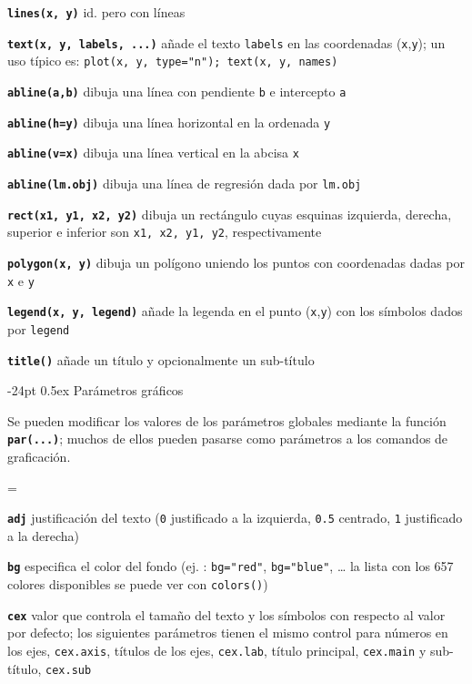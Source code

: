 \documentclass[10pt,landscape]{article}
\makeatletter
\renewcommand\section{\@startsection{section}{1}{0mm}%
                                     {-24pt}%
                                     {0.5ex}%
                                {\color[rgb]{1,0.54902,0}\normalfont\large\bfseries}}
\newcommand{\code}{\texttt}
\newcommand{\bcode}[1]{\texttt{\textbf{#1}}}
\makeatother
\begin{document}
\begin{multicols*}{3}
\bcode{lines(x, y)}  id. pero con líneas

\bcode{text(x, y, \mbox{labels}, ...)}  añade el texto \code{labels} en las coordenadas (\code{x},\code{y}); un uso típico es: \code{plot(x, y, type="n"); text(x, y, names)}

\bcode{abline(a,b)} dibuja una línea con pendiente \code{b} e intercepto \code{a}

\bcode{abline(h=y)}  dibuja una línea horizontal en la ordenada \code{y}

\bcode{abline(v=x)}  dibuja una línea vertical en la abcisa \code{x}

\bcode{abline(lm.obj)}  dibuja una línea de regresión dada por \code{lm.obj}

\bcode{rect(x1, y1, x2, y2)} dibuja un rectángulo cuyas esquinas izquierda, derecha, superior e inferior son \code{x1, x2, y1, y2}, respectivamente

\bcode{polygon(x, y)} dibuja un polígono uniendo los puntos con coordenadas dadas por \code{x} e \code{y}

\bcode{legend(x, y, legend)}  añade la legenda en el punto (\code{x},\code{y}) con los símbolos dados por \code{legend}

\bcode{title()}  añade un título y opcionalmente un sub-título




\section{Parámetros gráficos}

Se pueden modificar los valores de los parámetros globales mediante la función \bcode{par(...)}; muchos de ellos pueden pasarse como parámetros a los comandos de graficación.

\everypar={\hangindent=9mm}

\bcode{adj} justificación del texto (\code{0} justificado a la izquierda, \code{0.5} centrado,  \code{1} justificado a la derecha)

\bcode{bg}  especifica el color del fondo (ej. : \code{bg="red"}, \code{bg="blue"}, \ldots{} la lista con los 657 colores disponibles se puede ver con \code{colors()})

\bcode{cex} valor que controla el tamaño del texto y los símbolos con respecto al valor por defecto; los siguientes parámetros tienen el mismo control para números en los ejes, \code{cex.axis}, títulos de los ejes, \code{cex.lab}, título principal, \code{cex.main} y sub-título, \code{cex.sub}


\end{multicols*}
\end{document}
